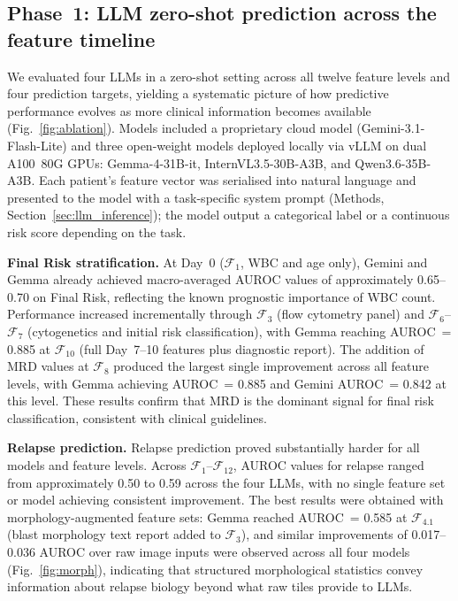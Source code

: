 \documentclass[pdflatex,sn-nature]{sn-jnl}
\begin{document}
\subsection{Phase~1: LLM zero-shot prediction across the feature timeline}
\label{sec:phase1}

We evaluated four LLMs in a zero-shot setting across all twelve feature
levels and four prediction targets, yielding a systematic picture of
how predictive performance evolves as more clinical information becomes
available (Fig.~\ref{fig:ablation}).
Models included a proprietary cloud model (Gemini-3.1-Flash-Lite) and
three open-weight models deployed locally via vLLM on dual A100~80G
GPUs: Gemma-4-31B-it, InternVL3.5-30B-A3B, and Qwen3.6-35B-A3B.
Each patient's feature vector was serialised into natural language and
presented to the model with a task-specific system prompt
(Methods, Section~\ref{sec:llm_inference}); the model output a
categorical label or a continuous risk score depending on the task.

\textbf{Final Risk stratification.}
At Day~0 ($\mathcal{F}_1$, WBC and age only), Gemini and Gemma already
achieved macro-averaged AUROC values of approximately 0.65--0.70 on
Final Risk, reflecting the known prognostic importance of WBC count.
Performance increased incrementally through $\mathcal{F}_3$ (flow
cytometry panel) and $\mathcal{F}_6$--$\mathcal{F}_7$ (cytogenetics
and initial risk classification), with Gemma reaching AUROC~= 0.885
at $\mathcal{F}_{10}$ (full Day~7--10 features plus diagnostic report).
The addition of MRD values at $\mathcal{F}_8$ produced the largest
single improvement across all feature levels, with Gemma achieving
AUROC~= 0.885 and Gemini AUROC~= 0.842 at this level.
These results confirm that MRD is the dominant signal for final
risk classification, consistent with clinical guidelines.

\textbf{Relapse prediction.}
Relapse prediction proved substantially harder for all models and
feature levels.
Across $\mathcal{F}_1$--$\mathcal{F}_{12}$, AUROC values for relapse
ranged from approximately 0.50 to 0.59 across the four LLMs, with no
single feature set or model achieving consistent improvement.
The best results were obtained with morphology-augmented feature sets:
Gemma reached AUROC~= 0.585 at $\mathcal{F}_{4.1}$ (blast morphology
text report added to $\mathcal{F}_3$), and similar improvements of
0.017--0.036 AUROC over raw image inputs were observed across all
four models (Fig.~\ref{fig:morph}), indicating that structured
morphological statistics convey information about relapse biology
beyond what raw tiles provide to LLMs.
\end{document}
